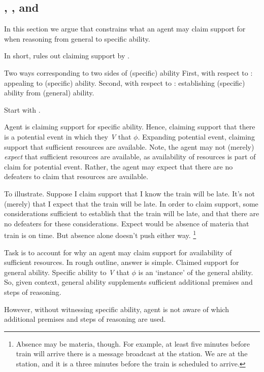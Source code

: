 \subsection{\ESU{}, \gsi{}, and }
\label{sec:first-conditional}

\begin{note}[Summary]
  In this section we argue that \ESU{} constrains what an agent may claim support for when reasoning from general to specific ability.

  In short, \ESU{} rules out claiming support by \ur{}.
\end{note}

\begin{note}
  Two ways corresponding to two sides of (specific) ability
  First, with respect to : appealing to (specific) ability.
  Second, with respect to \gsi{}: establishing (specific) ability from (general) ability.
\end{note}

\begin{note}
  Start with \gsi{}.

  Agent is claiming support for specific ability.
  Hence, claiming support that there is a potential event in which they \emph{V} that \(\phi\).
  Expanding potential event, claiming support that sufficient resources are available.
  Note, the agent may not (merely) \emph{expect} that sufficient resources are available, as availability of resources is part of claim for potential event.
  Rather, the agent may expect that there are no defeaters to claim that resources are available.

  To illustrate.
  Suppose I claim support that I know the train will be late.
  It's not (merely) that I expect that the train will be late.
  In order to claim support, some considerations sufficient to establish that the train will be late, and that there are no defeaters for these considerations.
  Expect would be absence of materia that train is on time.
  But absence alone doesn't push either way.\nolinebreak
  \footnote{
    Absence may be materia, though.
    For example, at least five minutes before train will arrive there is a message broadcast at the station.
    We are at the station, and it is a three minutes before the train is scheduled to arrive.
  }

  Task is to account for why an agent may claim support for availability of sufficient resources.
  In rough outline, answer is simple.
  Claimed support for general ability.
  Specific ability to \emph{V} that \(\phi\) is an `instance' of the general ability.
  So, given context, general ability supplements sufficient additional premises and steps of reasoning.

  However, without witnessing specific ability, agent is not aware of which additional premises and steps of reasoning are used.
\end{note}

